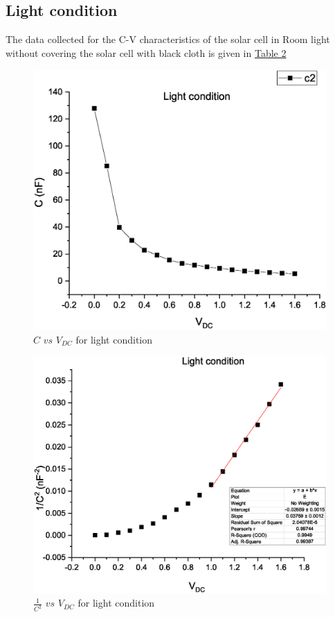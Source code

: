 	\subsection{Light condition}
 The data collected for the C-V characteristics of the solar cell in Room light without covering the solar cell with black cloth is given in \hyperref[tab:2]{Table 2}
		
   \begin{figure}[H]
			\centering
			\includegraphics[width=0.75\columnwidth]{images/GR2.eps}
			\caption{ $C$ $vs$ $V_{DC}$ for light condition}
			\label{graph:3}
\end{figure}
\begin{figure}[H]
			\centering
			\includegraphics[width=0.75\columnwidth]{images/GR6.eps}
			\caption{$\frac{1}{C^2}$ $vs$ $V_{DC}$ for light condition}
			\label{graph:4}
\end{figure}

